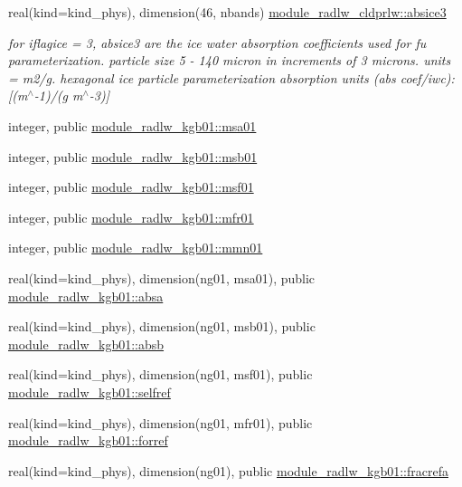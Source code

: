 \begin{DoxyCompactItemize}
real(kind=kind\+\_\+phys), dimension(46, nbands) \hyperlink{group__module__radlw__main_ga3aa04541d0b809367f88ef8aa0eafdbb}{module\+\_\+radlw\+\_\+cldprlw\+::absice3}
\begin{DoxyCompactList}\small\item\em for iflagice = 3, absice3 are the ice water absorption coefficients used for fu parameterization. particle size 5 -\/ 140 micron in increments of 3 microns. units = m2/g. hexagonal ice particle parameterization absorption units (abs coef/iwc)\+: \mbox{[}(m$^\wedge$-\/1)/(g m$^\wedge$-\/3)\mbox{]} \end{DoxyCompactList}\item 
integer, public \hyperlink{namespacemodule__radlw__kgb01_a60db2a67b7f03a52fa88acd2c7874dfc}{module\+\_\+radlw\+\_\+kgb01\+::msa01}
\item 
integer, public \hyperlink{group__module__radlw__main_gae34d953adc793ad27a294864e3e0e354}{module\+\_\+radlw\+\_\+kgb01\+::msb01}
\item 
integer, public \hyperlink{group__module__radlw__main_ga321c2e84e14d28142d08bb5fbe485a67}{module\+\_\+radlw\+\_\+kgb01\+::msf01}
\item 
integer, public \hyperlink{group__module__radlw__main_ga4bd2e710d96291436f9ee36e99816a19}{module\+\_\+radlw\+\_\+kgb01\+::mfr01}
\item 
integer, public \hyperlink{group__module__radlw__main_ga218c6844f9043f362571f091a4f80522}{module\+\_\+radlw\+\_\+kgb01\+::mmn01}
\item 
real(kind=kind\+\_\+phys), dimension(ng01, msa01), public \hyperlink{group__module__radlw__main_gacdbe767d50d503c4a89d4042dd0dee8e}{module\+\_\+radlw\+\_\+kgb01\+::absa}
\item 
real(kind=kind\+\_\+phys), dimension(ng01, msb01), public \hyperlink{group__module__radlw__main_gabdaefe1c38d8bfcac5ef9b878fac77cb}{module\+\_\+radlw\+\_\+kgb01\+::absb}
\item 
real(kind=kind\+\_\+phys), dimension(ng01, msf01), public \hyperlink{group__module__radlw__main_ga14c7cc68b26c0ab1fdfda6faa2d485d5}{module\+\_\+radlw\+\_\+kgb01\+::selfref}
\item 
real(kind=kind\+\_\+phys), dimension(ng01, mfr01), public \hyperlink{group__module__radlw__main_gacd70a32f88808dc40c39edee5b76adbe}{module\+\_\+radlw\+\_\+kgb01\+::forref}
\item 
real(kind=kind\+\_\+phys), dimension(ng01), public \hyperlink{group__module__radlw__main_ga0bca660247ac37483cd55c6936056631}{module\+\_\+radlw\+\_\+kgb01\+::fracrefa}

\end{DoxyCompactItemize}
